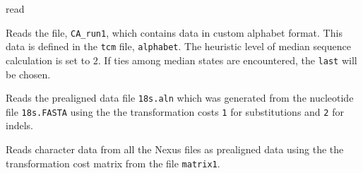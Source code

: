 \begin{command}{read}{}
\begin{poyexamples}
        {Reads the file, \texttt{CA\_run1}, which contains data in custom alphabet format.  
        This data is defined in the \texttt{tcm} file, \texttt{alphabet}. The heuristic level of 
        median sequence calculation is set to $2$.  If ties among median states are encountered, 
        the \texttt{last} will be chosen.} 
        
	{Reads the prealigned data file \texttt{18s.aln} which was generated from the nucleotide file \texttt{18s.FASTA}
	using the the transformation costs \texttt{1} for substitutions and \texttt{2} for indels.}
	
	{Reads character data from all the Nexus files as prealigned data using the the transformation cost
	 matrix from the file \texttt{matrix1}.}

	\end{poyexamples}

	\begin{poyalso}
	\end{poyalso}

\end{command}

   
